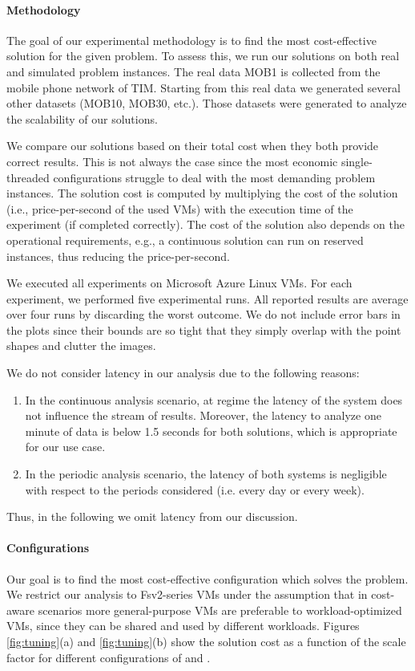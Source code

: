{\paragraph{Methodology}
The goal of our experimental methodology is to find the most cost-effective solution for the given problem. To assess this, we run our solutions on both real and simulated problem instances. The real data MOB1 is collected from the mobile phone network of TIM. Starting from this real data we generated several other datasets (MOB10, MOB30, etc.). Those datasets were generated to analyze the scalability of our solutions. 

We compare our solutions based on their total cost when they both provide correct results. This is not always the case since the most economic single-threaded configurations struggle to deal with the most demanding problem instances. The solution cost is computed by multiplying the cost of the solution (i.e., price-per-second of the used VMs) with the execution time of the experiment (if completed correctly). The cost of the solution also depends on the operational requirements, e.g., a continuous solution can run on reserved instances, thus reducing the price-per-second.

We executed all experiments on Microsoft Azure Linux VMs. For each experiment, we performed five experimental runs. All reported results are average over four runs by discarding the worst outcome. We do not include error bars in the plots since their bounds are so tight that they simply overlap with the point shapes and clutter the images.

We do not consider latency in our analysis due to the following reasons:
\begin{enumerate}
\item In the continuous analysis scenario, at regime the latency of the system does not influence the stream of results. Moreover, the latency to analyze one minute of data is below 1.5 seconds for both solutions, which is appropriate for our use case.
\item In the periodic analysis scenario, the latency of both systems is negligible with respect to the periods considered (i.e. every day or every week).
\end{enumerate}
Thus, in the following we omit latency from our discussion.

\paragraph{Configurations}
Our goal is to find the most cost-effective configuration which solves the problem. We restrict our analysis to Fsv2-series VMs under the assumption that in cost-aware scenarios more general-purpose VMs are preferable to workload-optimized VMs, since they can be shared and used by different workloads. Figures \ref{fig:tuning}(a) and \ref{fig:tuning}(b) show the solution cost as a function of the scale factor for different configurations of \sti{} and \sparkdi{}. 

}
